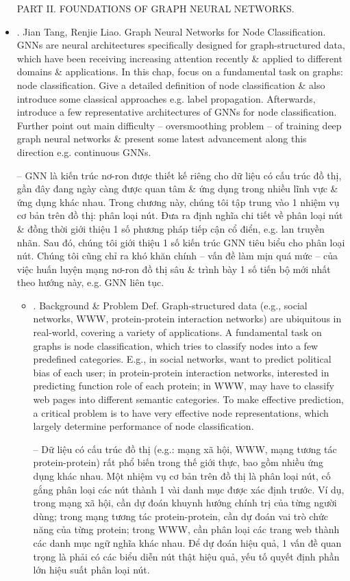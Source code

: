 \documentclass{article}
\begin{document}
\begin{itemize}
    PART II. FOUNDATIONS OF GRAPH NEURAL NETWORKS.
    \item {. {\sc Jian Tang, Renjie Liao}. Graph Neural Networks for Node Classification.} GNNs are neural architectures specifically designed for graph-structured data, which have been receiving increasing attention recently \& applied to different domains \& applications. In this chap, focus on a fundamental task on graphs: node classification. Give a detailed definition of node classification \& also introduce some classical approaches e.g. label propagation. Afterwards, introduce a few representative architectures of GNNs for node classification. Further point out main difficulty -- oversmoothing problem -- of training deep graph neural networks \& present some latest advancement along this direction e.g. continuous GNNs.

    -- GNN là kiến trúc nơ-ron được thiết kế riêng cho dữ liệu có cấu trúc đồ thị, gần đây đang ngày càng được quan tâm \& ứng dụng trong nhiều lĩnh vực \& ứng dụng khác nhau. Trong chương này, chúng tôi tập trung vào 1 nhiệm vụ cơ bản trên đồ thị: phân loại nút. Đưa ra định nghĩa chi tiết về phân loại nút \& đồng thời giới thiệu 1 số phương pháp tiếp cận cổ điển, e.g. lan truyền nhãn. Sau đó, chúng tôi giới thiệu 1 số kiến trúc GNN tiêu biểu cho phân loại nút. Chúng tôi cũng chỉ ra khó khăn chính -- vấn đề làm mịn quá mức -- của việc huấn luyện mạng nơ-ron đồ thị sâu \& trình bày 1 số tiến bộ mới nhất theo hướng này, e.g. GNN liên tục.
    \begin{itemize}
        \item {. Background \& Problem Def.} Graph-structured data (e.g., social networks, WWW, protein-protein interaction networks) are ubiquitous in real-world, covering a variety of applications. A fundamental task on graphs is node classification, which tries to classify nodes into a few predefined categories. E.g., in social networks, want to predict political bias of each user; in protein-protein interaction networks, interested in predicting function role of each protein; in WWW, may have to classify web pages into different semantic categories. To make effective prediction, a critical problem is to have very effective node representations, which largely determine performance of node classification.

        -- Dữ liệu có cấu trúc đồ thị (e.g.: mạng xã hội, WWW, mạng tương tác protein-protein) rất phổ biến trong thế giới thực, bao gồm nhiều ứng dụng khác nhau. Một nhiệm vụ cơ bản trên đồ thị là phân loại nút, cố gắng phân loại các nút thành 1 vài danh mục được xác định trước. Ví dụ, trong mạng xã hội, cần dự đoán khuynh hướng chính trị của từng người dùng; trong mạng tương tác protein-protein, cần dự đoán vai trò chức năng của từng protein; trong WWW, cần phân loại các trang web thành các danh mục ngữ nghĩa khác nhau. Để dự đoán hiệu quả, 1 vấn đề quan trọng là phải có các biểu diễn nút thật hiệu quả, yếu tố quyết định phần lớn hiệu suất phân loại nút.


\end{itemize}
\end{itemize}
\end{document}
